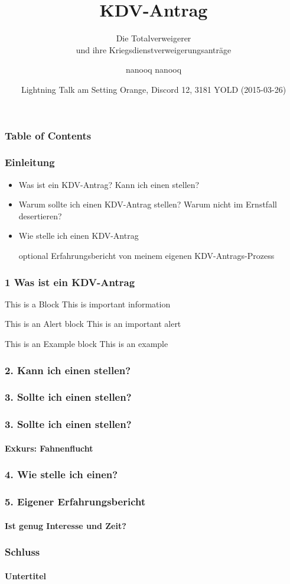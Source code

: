 \documentclass{beamer}
\title[KDV-Antrag] %
{KDV-Antrag}
\subtitle{Die Totalverweigerer \\und ihre Kriegsdienstverweigerungsanträge}
\author[nanooq nanooq] 
{nanooq nanooq}
\institute[Hackspace Siegen e.~V.] %
{
	\inst{1}%
	Hackspace Siegen e.~V.\\
	Effertsufer 104\\
	57072 Siegen
}
\date[2015-03-26] %
{Lightning Talk am Setting Orange, Discord 12, 3181 YOLD (2015-03-26)}
\begin{document}
	
	\frame{\titlepage}
	
	\begin{frame}
		\frametitle{Table of Contents}
		\tableofcontents[currentsection]
	\end{frame}
	
	
	\begin{frame}
	  	\frametitle{Einleitung}	  
	  	\begin{itemize}
	  		\item Was ist ein KDV-Antrag? Kann ich einen stellen?
	  		\item Warum sollte ich einen KDV-Antrag stellen? Warum nicht im Ernstfall desertieren?
	  		\item Wie stelle ich einen KDV-Antrag
		  	\item[optional] Erfahrungsbericht von meinem eigenen KDV-Antrags-Prozess
	  	\end{itemize}		
	\end{frame}
	  
	\begin{frame}
	  	\frametitle{1 Was ist ein KDV-Antrag}
		\begin{block}{This is a Block}
			This is important information
		\end{block}
		
		\begin{alertblock}{This is an Alert block}
			This is an important alert
		\end{alertblock}
		
		\begin{exampleblock}{This is an Example block}
			This is an example 
		\end{exampleblock}	
	\end{frame}
	
	\begin{frame}
		\frametitle{2. Kann ich einen stellen?}
	\end{frame}
	
	\begin{frame}
		\frametitle{3. Sollte ich einen stellen?}
	\end{frame}
	
	\begin{frame}
		\frametitle{3. Sollte ich einen stellen?}
		\framesubtitle{Exkurs: Fahnenflucht}
	\end{frame}
	
	\begin{frame}
		\frametitle{4. Wie stelle ich einen?}
	\end{frame}

	\begin{frame}
		\frametitle{5. Eigener Erfahrungsbericht}
		\framesubtitle{Ist genug Interesse und Zeit?}
	\end{frame}
	
	\begin{frame}
	 	  	\frametitle{Schluss}	
  		  	\framesubtitle{Untertitel}
	\end{frame}
	  
\end{document}
